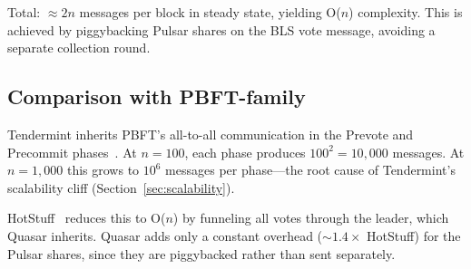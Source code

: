 Total: $\approx 2n$ messages per block in steady state, yielding O($n$) complexity.
This is achieved by piggybacking Pulsar shares on the BLS vote message, avoiding a
separate collection round.

\subsection{Comparison with PBFT-family}

Tendermint inherits PBFT's all-to-all communication in the Prevote and
Precommit phases~\cite{tendermint}.
At $n{=}100$, each phase produces $100^2{=}10{,}000$ messages.
At $n{=}1{,}000$ this grows to $10^6$ messages per phase---the root
cause of Tendermint's scalability cliff (Section~\ref{sec:scalability}).

HotStuff~\cite{hotstuff} reduces this to O($n$) by funneling all votes through
the leader, which Quasar inherits. Quasar adds only a constant overhead
(${\sim}1.4{\times}$ HotStuff) for the Pulsar shares, since they are
piggybacked rather than sent separately.

